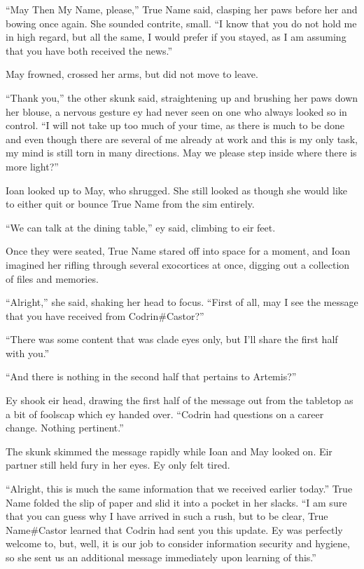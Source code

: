 ``May Then My Name, please,'' True Name said, clasping her paws before her and bowing once again. She sounded contrite, small. ``I know that you do not hold me in high regard, but all the same, I would prefer if you stayed, as I am assuming that you have both received the news.''

May frowned, crossed her arms, but did not move to leave.

``Thank you,'' the other skunk said, straightening up and brushing her paws down her blouse, a nervous gesture ey had never seen on one who always looked so in control. ``I will not take up too much of your time, as there is much to be done and even though there are several of me already at work and this is my only task, my mind is still torn in many directions. May we please step inside where there is more light?''

Ioan looked up to May, who shrugged. She still looked as though she would like to either quit or bounce True Name from the sim entirely.

``We can talk at the dining table,'' ey said, climbing to eir feet.

Once they were seated, True Name stared off into space for a moment, and Ioan imagined her rifling through several exocortices at once, digging out a collection of files and memories.

``Alright,'' she said, shaking her head to focus. ``First of all, may I see the message that you have received from Codrin\#Castor?''

``There was some content that was clade eyes only, but I'll share the first half with you.''

``And there is nothing in the second half that pertains to Artemis?''

Ey shook eir head, drawing the first half of the message out from the tabletop as a bit of foolscap which ey handed over. ``Codrin had questions on a career change. Nothing pertinent.''

The skunk skimmed the message rapidly while Ioan and May looked on. Eir partner still held fury in her eyes. Ey only felt tired.

``Alright, this is much the same information that we received earlier today.'' True Name folded the slip of paper and slid it into a pocket in her slacks. ``I am sure that you can guess why I have arrived in such a rush, but to be clear, True Name\#Castor learned that Codrin had sent you this update. Ey was perfectly welcome to, but, well, it is our job to consider information security and hygiene, so she sent us an additional message immediately upon learning of this.''

